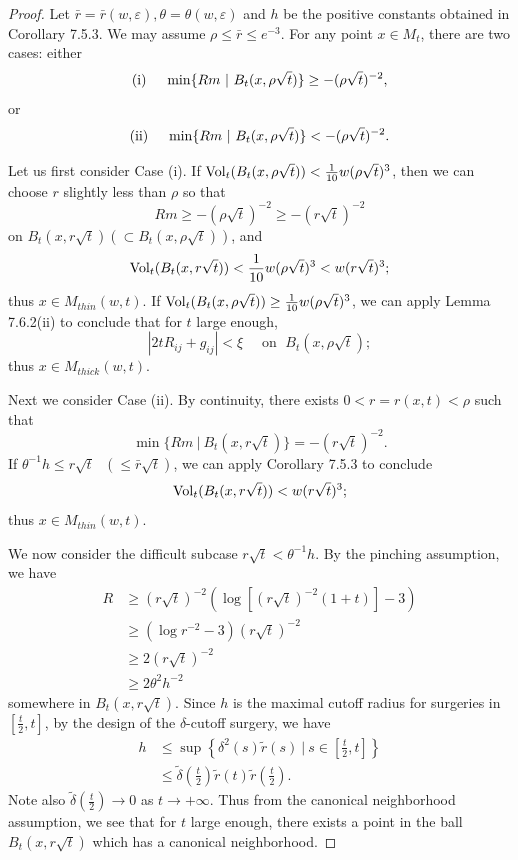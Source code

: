 \begin{proof}
Let $\bar{r}=\bar{r}(w,\varepsilon),\theta=\theta(w,\varepsilon)$
and $h$ be the positive constants obtained in Corollary 7.5.3. We
may assume $\rho\leq\bar{r} \leq e^{-3}$. For any point $x\in
M_t$, there are two cases: either
$$
{\rm (i)}\ \ \ \mbox{ } \min\{Rm\ |\ B_t(x,\rho\sqrt{t})\}\geq
-(\rho\sqrt{t})^{-2},
$$
or
$$
{\rm (ii)}\ \ \ \mbox{    } \min\{Rm\ |\
B_t(x,\rho\sqrt{t})\}<-(\rho\sqrt{t})^{-2}.$$

Let us first consider Case (i). If
$\operatorname{Vol}_t(B_t(x,\rho\sqrt{t}))<\frac{1}{10}w(\rho\sqrt{t})^3$, then
we can choose $r$ slightly less than $\rho$ so that
$$
Rm\geq -(\rho\sqrt{t})^{-2}\geq -(r\sqrt{t})^{-2}
$$
on $B_t(x,r\sqrt{t})(\subset B_t(x,\rho\sqrt{t}))$, and
$$
\operatorname{Vol}_t(B_t(x,r\sqrt{t}))<\frac{1}{10}w(\rho\sqrt{t})^3<w(r\sqrt{t})^3;
$$
thus $x\in M_{thin}(w,t)$. If $\operatorname{Vol}_t(B_t(x,\rho\sqrt{t}))\geq
\frac{1}{10}w(\rho\sqrt{t})^3$, we can apply Lemma 7.6.2(ii) to
conclude that for $t$ large enough,
$$
|2tR_{ij}+g_{ij}|<\xi \quad \mbox{ on }\; B_t(x,\rho\sqrt{t});
$$
thus $x\in M_{thick}(w,t)$.

Next we consider Case (ii). By continuity, there exists
$0<r=r(x,t)<\rho$ such that \begin{equation}
\min\{Rm\ |\ B_t(x,r\sqrt{t})\}=-(r\sqrt{t})^{-2}. %
\end{equation} If $\theta^{-1}h\leq r\sqrt{t}\mbox{  }(\leq
\bar{r}\sqrt{t})$, we can apply Corollary 7.5.3 to conclude
$$
\operatorname{Vol}_t(B_t(x,r\sqrt{t}))<w(r\sqrt{t})^3;
$$
thus $x\in M_{thin}(w,t)$.

We now consider the difficult subcase $\mbox{}r\sqrt{t}
<\theta^{-1}h$. By the pinching assumption, we have
\begin{align*}
R &  \geq (r\sqrt{t})^{-2}(\log[(r\sqrt{t})^{-2}(1+t)] -3)\\
&  \geq (\log r^{-2}-3)(r\sqrt{t})^{-2}\\
&  \geq 2(r\sqrt{t})^{-2}\\
&  \geq 2\theta^{2}h^{-2}
\end{align*}
somewhere in $B_t(x,r\sqrt{t})$. Since $h$ is the maximal cutoff
radius for surgeries in $[\frac{t}{2},t]$, by the design of the
$\delta$-cutoff surgery, we have
\begin{align*}
 h &  \leq \sup \left\{{\delta}^2(s)\widetilde{r}(s)\ |\ s\in
\left[\frac{t}{2},t\right]\right\}\\
& \leq\widetilde{\delta}\left(\frac{t}{2}\right)
\widetilde{r}(t)\widetilde{r}\left(\frac{t}{2}\right).
\end{align*}
Note also $\widetilde{\delta}(\frac{t}{2})\rightarrow0$ as
$t\rightarrow+\infty$. Thus from the canonical neighborhood
assumption, we see that for $t$ large enough, there exists a point
in the ball $B_t(x,r\sqrt{t})$ which has a canonical neighborhood.


\end{proof}
